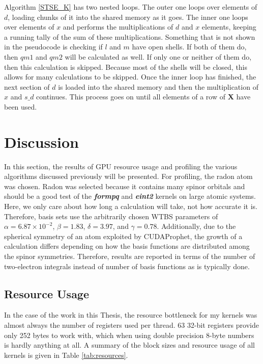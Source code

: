 \documentclass[12pt]{report}
\newcommand{\kernel}[1]{\textit{\textbf{#1}}}
\begin{document}
Algorithm \ref{STSE_K} has two nested loops. The outer one loops over elements of $d$, loading chunks of it into the shared memory as it goes. The inner one loops over elements of $x$ and performs the multiplications of $d$ and $x$ elements, keeping a running tally of the sum of these multiplications. Something that is not shown in the pseudocode is checking if $l$ and $m$ have open shells. If both of them do, then $qm1$ and $qm2$ will be calculated as well. If only one or neither of them do, then this calculation is skipped. Because most of the shells will be closed, this allows for many calculations to be skipped. Once the inner loop has finished, the next section of $d$ is loaded into the shared memory and then the multiplication of $x$ and $s\_d$ continues. This process goes on until all elements of a row of \textbf{X} have been used.

\section{Discussion}
In this section, the results of GPU resource usage and profiling the various algorithms discussed previously will be presented. For profiling, the radon atom was chosen. Radon was selected because it contains many spinor orbitals and should be a good test of the \kernel{formpq} and \kernel{eint2} kernels on large atomic systems. Here, we only care about how long a calculation will take, not how accurate it is. Therefore, basis sets use the arbitrarily chosen WTBS parameters of $\alpha = 6.87\times10^{-2}$, $\beta = 1.83$,  $\delta = 3.97$, and $\gamma = 0.78$. Additionally, due to the spherical symmetry of an atom exploited by CUDAProphet, the growth of a calculation differs depending on how the basis functions are distributed among the spinor symmetries. Therefore, results are reported in terms of the number of two-electron integrals instead of number of basis functions as is typically done.
\subsection{Resource Usage}
In the case of the work in this Thesis, the resource bottleneck for my kernels was almost always the number of registers used per thread. 63 32-bit registers provide only 252 bytes to work with, which when using double precision 8-byte numbers is hardly anything at all. A summary of the block sizes and resource usage of all kernels is given in Table \ref{tab:resources}.
\end{document}
